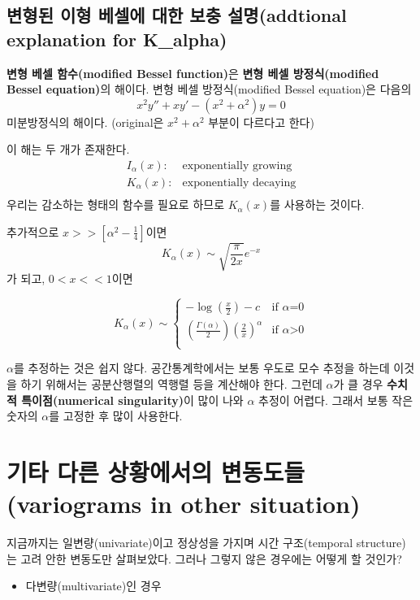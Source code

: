\documentclass[b5paper,]{book}
\providecommand{\tightlist}{%
  \setlength{\itemsep}{0pt}\setlength{\parskip}{0pt}}
\theoremstyle{definition}
\theoremstyle{definition}
\theoremstyle{definition}
\theoremstyle{remark}
\begin{document}
\subsection{변형된 이형 베셀에 대한 보충 설명(addtional explanation for
K\_alpha)}\label{-----addtional-explanation-for-k_alpha}

\textbf{변형 베셀 함수(modified Bessel function)}은 \textbf{변형 베셀
방정식(modified Bessel equation)}의 해이다. 변형 베셀 방정식(modified
Bessel equation)은 다음의 \[x^{2}y''+xy'-(x^{2}+\alpha^{2})y=0\]
미분방정식의 해이다. (original은 \(x^{2}+\alpha^{2}\) 부분이 다르다고
한다)

이 해는 두 개가 존재한다. \[
\begin{array}{ll}
I_{\alpha}(x): & \text{exponentially growing}\\
K_{\alpha}(x): & \text{exponentially decaying}\\
\end{array}
\] 우리는 감소하는 형태의 함수를 필요로 하므로 \(K_{\alpha}(x)\)를
사용하는 것이다.

추가적으로 \(x >> [\alpha^{2}-\frac{1}{4}]\)이면
\[K_{\alpha}(x) \sim \sqrt{\frac{\pi}{2x}}e^{-x}\] 가 되고,
\(0<x<<1\)이면

\[
K_{\alpha}(x) \sim \left\{ \begin{array}{ll}
-\log (\frac{x}{2}) - c & \textrm{if $\alpha$=0}\\
(\frac{\Gamma(\alpha)}{2})(\frac{2}{x})^{\alpha} & \textrm{if $\alpha$>0}\\
\end{array} \right.
\]

\(\alpha\)를 추정하는 것은 쉽지 않다. 공간통계학에서는 보통 우도로 모수
추정을 하는데 이것을 하기 위해서는 공분산행렬의 역행렬 등을 계산해야
한다. 그런데 \(\alpha\)가 클 경우 \textbf{수치적 특이점(numerical
singularity)}이 많이 나와 \(\alpha\) 추정이 어렵다. 그래서 보통 작은
숫자의 \(\alpha\)를 고정한 후 많이 사용한다.

\section{기타 다른 상황에서의 변동도들(variograms in other
situation)}\label{---variograms-in-other-situation}

지금까지는 일변량(univariate)이고 정상성을 가지며 시간 구조(temporal
structure)는 고려 안한 변동도만 살펴보았다. 그러나 그렇지 않은 경우에는
어떻게 할 것인가?

\begin{itemize}
\tightlist
\item
  다변량(multivariate)인 경우
\end{itemize}
\end{document}
